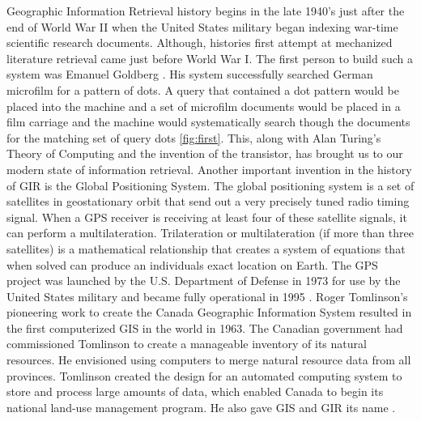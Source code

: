 \documentclass[10pt, conference, compsocconf]{IEEEtran}
\begin{document}
Geographic Information Retrieval history begins in the late 1940's just after the end of World War II when the United States military began indexing war-time scientific research documents. Although, histories first attempt at mechanized literature retrieval came just before World War I. The first person to build such a system was Emanuel Goldberg \cite{Sanderson:2012cga}. His system successfully searched German microfilm for a pattern of dots. A query that contained a dot pattern would be placed into the machine and a set of microfilm documents would be placed in a film carriage and the machine would systematically search though the documents for the matching set of query dots \ref{fig:first}. This, along with Alan Turing's Theory of Computing and the invention of the transistor, has brought us to our modern state of information retrieval. Another important invention in the history of GIR is the Global Positioning System. The global positioning system is a set of satellites in geostationary orbit that send out a very precisely tuned radio timing signal. When a GPS receiver is receiving at least four of these satellite signals, it can perform a multilateration. Trilateration or multilateration (if more than three satellites) is a mathematical relationship that creates a system of equations that when solved can produce an individuals exact location on Earth. The GPS project was launched by the U.S. Department of Defense in 1973 for use by the United States military and became fully operational in 1995 \cite{Walker:2007hr}. Roger Tomlinson’s pioneering work to create the Canada Geographic Information System resulted in the first computerized GIS in the world in 1963. The Canadian government had commissioned Tomlinson to create a manageable inventory of its natural resources. He envisioned using computers to merge natural resource data from all provinces. Tomlinson created the design for an automated computing system to store and process large amounts of data, which enabled Canada to begin its national land-use management program. He also gave GIS and GIR its name \cite{Jones:2008isa}.    
\end{document}
